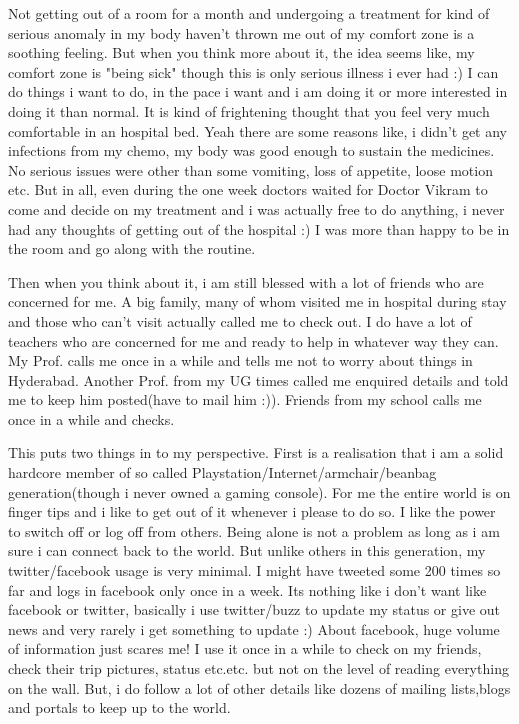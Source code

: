 Not getting out of a room for a month and undergoing a treatment for kind of serious anomaly in my body haven't thrown me out of my comfort zone is a soothing feeling. But when you think more about it, the idea seems like, my comfort zone is "being sick" though this is only serious illness i ever had :) I can do things i want to do, in the pace i want and i am doing it or more interested in doing it than normal. It is kind of frightening thought that you feel very much comfortable in an hospital bed. Yeah there are some reasons like, i didn't get any infections from my chemo, my body was good enough to sustain the medicines. No serious issues were other than some vomiting, loss of appetite, loose motion etc. But in all, even during the one week doctors waited for Doctor Vikram to come and decide on my treatment and i was actually free to do anything, i never had any thoughts of getting out of the hospital :) I was more than happy to be in the room and go along with the routine. 

Then when you think about it, i am still blessed with a lot of friends who are concerned for me. A big family, many of whom visited me in hospital during stay and those who can't visit actually called me to check out. I do have a lot of teachers who are concerned for me and ready to help in whatever way they can. My Prof. calls me once in a while and tells me not to worry about things in Hyderabad. Another Prof. from my UG times called me enquired details and told me to keep him posted(have to mail him :)). Friends from my school calls me once in a while and checks.

This puts two things in to my perspective. First is a realisation that i am a solid hardcore member of so called Playstation/Internet/armchair/beanbag generation(though i never owned a gaming console). For me the entire world is on finger tips and i like to get out of it whenever i please to do so. I like the power to switch off or log off from others. Being alone is not a problem as long as i am sure i can connect back to the world. But unlike others in this generation, my twitter/facebook usage is very minimal. I might have tweeted some 200 times so far and logs in facebook only once in a week. Its nothing like i don't want like facebook or twitter, basically i use twitter/buzz to update my status or give out news and very rarely i get something to update :) About facebook, huge volume of information just scares me! I use it once in a while to check on my friends, check their trip pictures, status etc.etc. but not on the level of reading everything on the wall. But, i do follow a lot of other details like dozens of mailing lists,blogs and portals to keep up to the world. 

